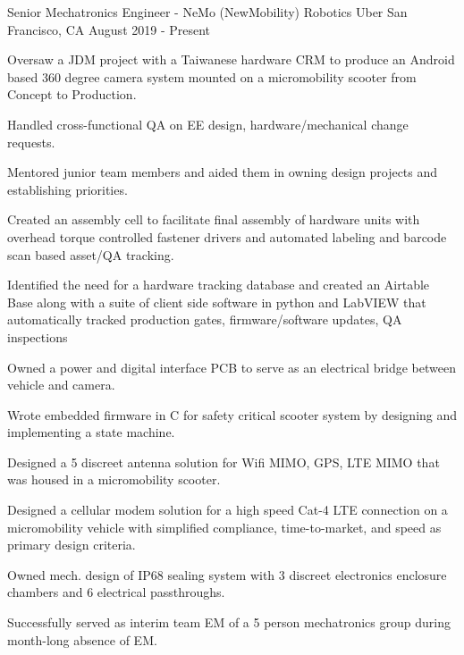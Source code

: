 

\begin{cventries}

  \cventry
    {Senior Mechatronics Engineer - NeMo (NewMobility) Robotics} %
    {Uber} %
    {San Francisco, CA} %
    {August 2019 - Present} %
    {
      \begin{cvitems} %
        \item {Oversaw a JDM project with a Taiwanese hardware CRM to produce an Android based 360 degree camera system mounted on a micromobility scooter from Concept to Production.}
        \item {Handled cross-functional QA on EE design, hardware/mechanical change requests.}
        \item {Mentored junior team members and aided them in owning design projects and establishing priorities.}
        \item {Created an assembly cell to facilitate final assembly of hardware units with overhead torque controlled fastener drivers and automated labeling and barcode scan based asset/QA tracking.}
        \item {Identified the need for a hardware tracking database and created an Airtable Base along with a suite of client side software in python and LabVIEW that automatically tracked production gates, firmware/software updates, QA inspections } 
        \item {Owned a power and digital interface PCB to serve as an electrical bridge between vehicle and camera.}
        \item {Wrote embedded firmware in C for safety critical scooter system by designing and implementing a state machine.} 
        \item {Designed a 5 discreet antenna solution for Wifi MIMO, GPS, LTE MIMO that was housed in a micromobility scooter.}
        \item {Designed a cellular modem solution for a high speed Cat-4 LTE connection on a micromobility vehicle with simplified compliance, time-to-market, and speed as primary design criteria.}
        \item {Owned mech. design of IP68 sealing system with 3 discreet electronics enclosure chambers and 6 electrical passthroughs.}
        \item {Successfully served as interim team EM of a 5 person mechatronics group during month-long absence of EM.}
      \end{cvitems}
    }


\end{cventries}
